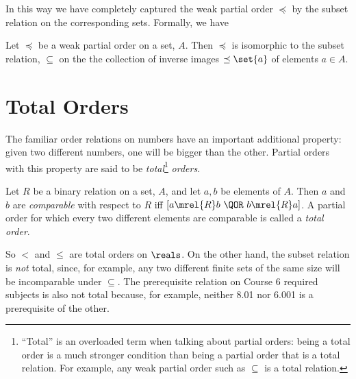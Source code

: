 In this way we have completely captured the weak partial order $\preceq$ by the
subset relation on the corresponding sets.  Formally, we have
\begin{lemma}\label{rgb}
Let $\preceq$ be a weak partial order on a set, $A$.  Then $\preceq$ is
isomorphic to the subset relation, $\subseteq$ on the the collection of
inverse images $\preceq\set{a}$ of elements $a \in A$.
\end{lemma}

\begin{problems}
\homeworkproblems
{}
\end{problems}


\section{Total Orders}

The familiar order relations on numbers have an important additional
property: given two different numbers, one will be bigger than the other.
Partial orders with this property are said to be
\emph{total}\footnote{``Total'' is an overloaded term when talking about
  partial orders: being a total order is a much stronger condition than
  being a partial order that is a total relation.  For example, any weak
  partial order such as $\subseteq$ is a total relation.} \emph{orders}.

\begin{definition}
Let $R$ be a binary relation on a set, $A$, and let $a, b$ be elements of
$A$.  Then $a$ and $b$ are \emph{comparable} with respect to $R$ iff $[a
  \mrel{R} b\ \QOR\ b \mrel{R} a]$.  A partial order for which every two
different elements are comparable is called a \emph{total order}.
\end{definition}

So $<$ and $\le$ are total orders on $\reals$.  On the other hand, the
subset relation is \emph{not} total, since, for example, any two different
finite sets of the same size will be incomparable under $\subseteq$.  The
prerequisite relation on Course 6 required subjects is also not total
because, for example, neither 8.01 nor 6.001 is a prerequisite of the
other.



